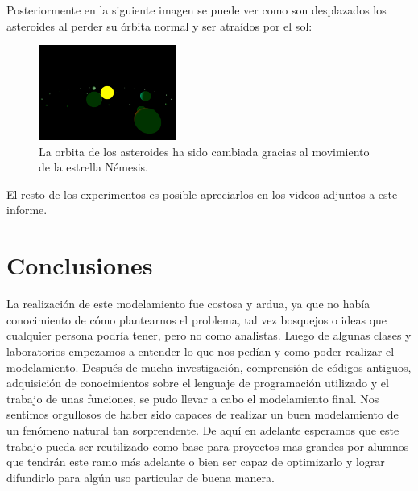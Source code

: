 \documentclass[journal]{IEEEtran}
\begin{document}
Posteriormente en la siguiente imagen se puede ver como son desplazados los asteroides al perder su órbita normal y ser atraídos por el sol:

\begin{figure}[h!]
	\includegraphics[width=0.4\textwidth, height=0.25\textwidth]{imagen_fea2.png}
	\centering
	\caption{La orbita de los asteroides ha sido cambiada gracias al
movimiento de la estrella Némesis.}
\end{figure}

El resto de los experimentos es posible apreciarlos en los videos adjuntos a este informe.

\section{Conclusiones}

La realización de este modelamiento fue costosa y ardua, ya que no había conocimiento de cómo plantearnos el problema, tal vez bosquejos o ideas que cualquier persona podría tener, pero no como analistas. Luego de algunas clases y laboratorios empezamos a entender lo que nos pedían y como poder realizar el modelamiento. Después de mucha investigación, comprensión de códigos antiguos, adquisición de conocimientos sobre el lenguaje de programación utilizado y el trabajo de unas funciones, se pudo llevar a cabo el modelamiento final. Nos sentimos orgullosos de haber sido capaces de realizar un buen modelamiento de un fenómeno natural tan sorprendente. De aquí en adelante esperamos que este trabajo pueda ser reutilizado como base para proyectos mas grandes por alumnos que tendrán este ramo más adelante o bien ser capaz de optimizarlo y lograr difundirlo para algún uso particular de buena manera.



\end{document}
